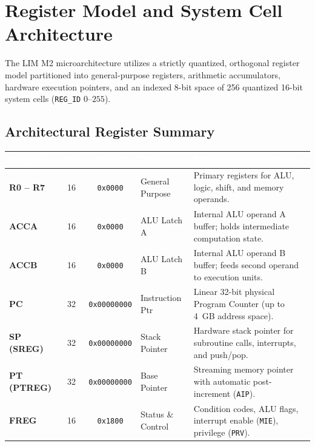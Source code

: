\documentclass[11pt,a4paper]{article}
\begin{document}
\section{Register Model and System Cell Architecture}

The LIM M2 microarchitecture utilizes a strictly quantized, orthogonal register model partitioned into general-purpose registers, arithmetic accumulators, hardware execution pointers, and an indexed 8-bit space of 256 quantized 16-bit system cells (\texttt{REG\_ID} \(0\)--\(255\)).

\subsection{Architectural Register Summary}

\noindent
\begin{minipage}{\textwidth}
\centering
\small
\begin{tabularx}{\textwidth}{l c c l X}
\toprule
\rowcolor{limslate}
\textcolor{white}{\textbf{Register}} & \textcolor{white}{\textbf{Bits}} & \textcolor{white}{\textbf{Reset}} & \textcolor{white}{\textbf{Type}} & \textcolor{white}{\textbf{Microarchitectural Role}} \\
\midrule
\rowcolors{2}{limroweven}{white}
\textbf{R0 -- R7} & 16 & \texttt{0x0000} & General Purpose & Primary registers for ALU, logic, shift, and memory operands. \\
\textbf{ACCA} & 16 & \texttt{0x0000} & ALU Latch A & Internal ALU operand A buffer; holds intermediate computation state. \\
\textbf{ACCB} & 16 & \texttt{0x0000} & ALU Latch B & Internal ALU operand B buffer; feeds second operand to execution units. \\
\textbf{PC} & 32 & \texttt{0x00000000} & Instruction Ptr & Linear 32-bit physical Program Counter (up to 4~GB address space). \\
\textbf{SP (SREG)} & 32 & \texttt{0x00000000} & Stack Pointer & Hardware stack pointer for subroutine calls, interrupts, and push/pop. \\
\textbf{PT (PTREG)} & 32 & \texttt{0x00000000} & Base Pointer & Streaming memory pointer with automatic post-increment (\texttt{AIP}). \\
\textbf{FREG} & 16 & \texttt{0x1800} & Status \& Control & Condition codes, ALU flags, interrupt enable (\texttt{MIE}), privilege (\texttt{PRV}). \\
\bottomrule
\end{tabularx}
\end{minipage}
\end{document}
